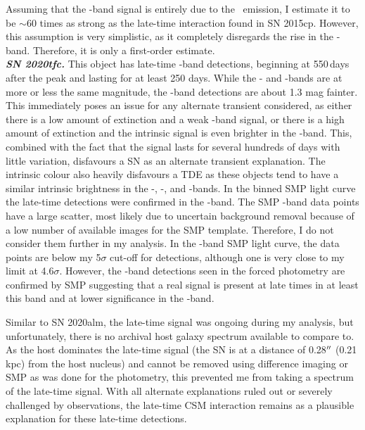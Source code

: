\documentclass[a4paper,oneside,12pt, class=Latex/Classes/PhDthesisPSnPDF, crop=false]{standalone}
\begin{document}
Assuming that the \ztfr-band signal is entirely due to the \Halpha~emission, I estimate it to be $\sim60$ times as strong as the late-time interaction found in SN 2015cp. However, this assumption is very simplistic, as it completely disregards the rise in the \ztfi-band. Therefore, it is only a first-order estimate.\\


\textit{\textbf{SN 2020tfc.}}
This object has late-time \ztfg\ztfr\ztfi-band detections, beginning at 550\,days after the peak and lasting for at least 250 days. While the \ztfr- and \ztfi-bands are at more or less the same magnitude, the \ztfg-band detections are about 1.3 mag fainter. This immediately poses an issue for any alternate transient considered, as either there is a low amount of extinction and a weak \ztfg-band signal, or there is a high amount of extinction and the intrinsic signal is even brighter in the \ztfi-band. This, combined with the fact that the signal lasts for several hundreds of days with little variation, disfavours a SN as an alternate transient explanation. The intrinsic colour also heavily disfavours a TDE as these objects tend to have a similar intrinsic brightness in the \ztfg-, \ztfr-, and \ztfi-bands. In the binned SMP light curve the late-time detections were confirmed in the \ztfg-band. The SMP \ztfi-band data points have a large scatter, most likely due to uncertain background removal because of a low number of available images for the SMP template. Therefore, I do not consider them further in my analysis. In the \ztfr-band SMP light curve, the data points are below my 5$\sigma$ cut-off for detections, although one is very close to my limit at 4.6$\sigma$. However, the \ztfg-band detections seen in the forced photometry are confirmed by SMP suggesting that a real signal is present at late times in at least this band and at lower significance in the \ztfr-band.

Similar to SN 2020alm, the late-time signal was ongoing during my analysis, but unfortunately, there is no archival host galaxy spectrum available to compare to. As the host dominates the late-time signal (the SN is at a distance of 0.28$^{\prime\prime}$ (0.21 kpc) from the host nucleus) and cannot be removed using difference imaging or SMP as was done for the photometry, this prevented me from taking a spectrum of the late-time signal. With all alternate explanations ruled out or severely challenged by observations, the late-time CSM interaction remains as a plausible explanation for these late-time detections.
\end{document}
